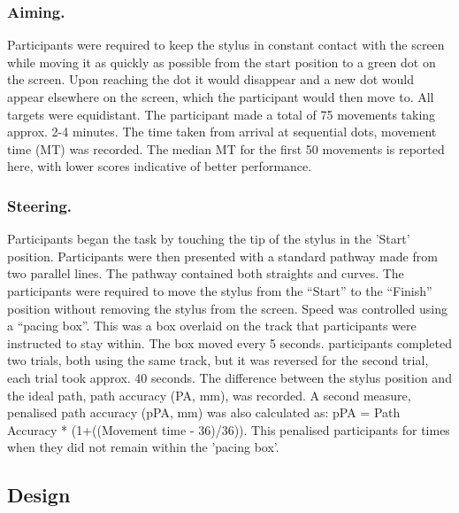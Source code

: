 \documentclass[
  english,
  man,floatsintext]{apa6}
\begin{document}
\hypertarget{aiming.}{%
\subsubsection{Aiming.}\label{aiming.}}

Participants were required to keep the stylus in constant contact with the screen while moving it as quickly as possible from the start position to a green dot on the screen.
Upon reaching the dot it would disappear and a new dot would appear elsewhere on the screen, which the participant would then move to. All targets were equidistant.
The participant made a total of 75 movements taking approx. 2-4 minutes.
The time taken from arrival at sequential dots, movement time (MT) was recorded.
The median MT for the first 50 movements is reported here, with lower scores indicative of better performance.

\hypertarget{steering.}{%
\subsubsection{Steering.}\label{steering.}}

Participants began the task by touching the tip of the stylus in the 'Start' position. Participants were then presented with a standard pathway made from two parallel lines.
The pathway contained both straights and curves.
The participants were required to move the stylus from the \enquote{Start} to the \enquote{Finish} position without removing the stylus from the screen.
Speed was controlled using a \enquote{pacing box}.
This was a box overlaid on the track that participants were instructed to stay within.
The box moved every 5 seconds. participants completed two trials, both using the same track, but it was reversed for the second trial, each trial took approx. 40 seconds.
The difference between the stylus position and the ideal path, path accuracy (PA, mm), was recorded.
A second measure, penalised path accuracy (pPA, mm) was also calculated as: pPA = Path Accuracy * (1+((Movement time - 36)/36)).
This penalised participants for times when they did not remain within the 'pacing box'.

\hypertarget{design}{%
\subsection{Design}\label{design}}
\end{document}
